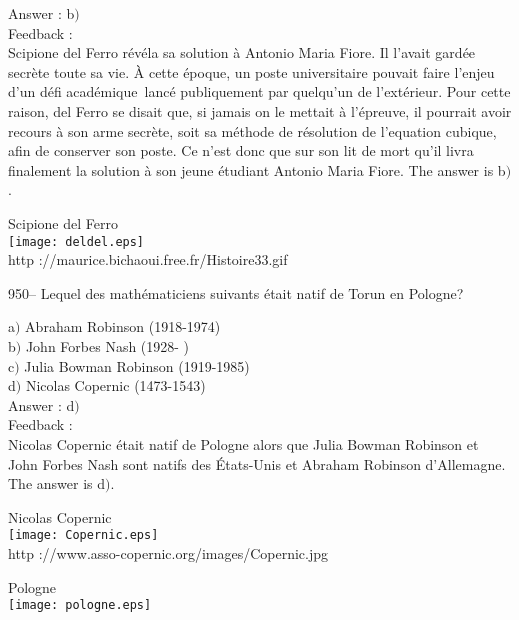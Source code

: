 \documentclass[letterpaper, 12pt]{article}
\begin{document}
Answer : b$)$\\

Feedback : \\
Scipione del Ferro r\'ev\'ela sa solution \`a Antonio Maria Fiore.
Il l'avait gard\'ee secr\`ete toute sa vie. \`A cette \'epoque, un
poste universitaire pouvait faire l'enjeu d'un \og d\'efi
acad\'emique\fg\ lanc\'e publiquement par quelqu'un de
l'ext\'erieur. Pour cette raison, del Ferro se disait que, si jamais
on le mettait \`a l'\'epreuve, il pourrait avoir recours \`a son
arme secr\`ete, soit sa m\'ethode de r\'esolution de l'equation
cubique, afin de conserver son poste. Ce n'est donc que sur son lit
de mort qu'il livra finalement la solution \`a son jeune
\'etudiant Antonio Maria Fiore. The answer is b$)$.\\

        \begin{center}
        Scipione del Ferro\\
    \texttt{[image: deldel.eps]}\\
        {\footnotesize http ://maurice.bichaoui.free.fr/Histoire33.gif}
    \end{center}

950-- Lequel des math\'ematiciens suivants \'etait natif de Torun en
Pologne?

a$)$ Abraham Robinson (1918-1974) \\
b$)$ John Forbes Nash (1928- ) \\
c$)$ Julia Bowman Robinson (1919-1985) \\
d$)$ Nicolas Copernic (1473-1543) \\

Answer : d$)$\\

Feedback : \\
Nicolas Copernic \'etait natif de Pologne alors que Julia Bowman
Robinson et John Forbes Nash sont natifs des \'Etats-Unis
et Abraham Robinson d'Allemagne. The answer is d$)$.\\

        \begin{center}
        Nicolas Copernic\\
    \texttt{[image: Copernic.eps]}\\
        {\footnotesize http ://www.asso-copernic.org/images/Copernic.jpg}
    \end{center}

        \begin{center}
        Pologne\\
    \texttt{[image: pologne.eps]}\\
    \end{center}
\end{document}

